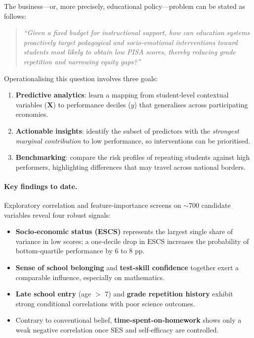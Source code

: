 \documentclass[final,5p,times,twocolumn,authoryear]{elsarticle}
\begin{document}
The business—or, more precisely, educational policy—problem can be stated as follows:

\begin{quote}
  \emph{“Given a fixed budget for instructional support, how can education systems proactively target pedagogical and socio‑emotional interventions toward students most likely to obtain low PISA scores, thereby reducing grade repetition and narrowing equity gaps?”}
\end{quote}

Operationalising this question involves three goals:

\begin{enumerate}
  \item \textbf{Predictive analytics}: learn a mapping from student‑level contextual variables ($\mathbf{X}$) to performance deciles ($y$) that generalises across participating economies.
  \item \textbf{Actionable insights}: identify the subset of predictors with the \emph{strongest marginal contribution} to low performance, so interventions can be prioritised.
  \item \textbf{Benchmarking}: compare the risk profiles of repeating students against high performers, highlighting differences that may travel across national borders.
\end{enumerate}

\paragraph{Key findings to date.}
Exploratory correlation and feature‑importance screens on $\sim700$ candidate variables reveal four robust signals:

\begin{itemize}
  \item \textbf{Socio‑economic status (ESCS)} represents the largest single share of variance in low scores; a one‑decile drop in ESCS increases the probability of bottom-quartile performance by 6 to 8 pp.
  \item \textbf{Sense of school belonging} and \textbf{test‑skill confidence} together exert a comparable influence, especially on mathematics.
  \item \textbf{Late school entry} (age $>$ 7) and \textbf{grade repetition history} exhibit strong conditional correlations with poor science outcomes.
  \item Contrary to conventional belief, \textbf{time‑spent‑on‑homework} shows only a weak negative correlation once SES and self‑efficacy are controlled.
\end{itemize}
\end{document}
